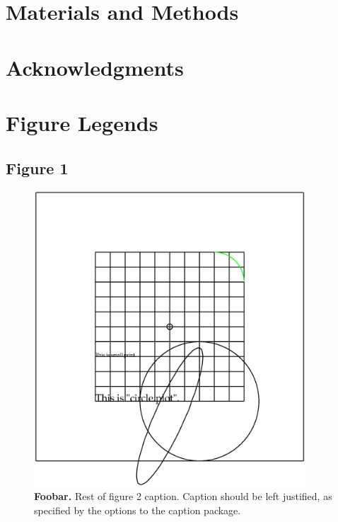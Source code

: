 \documentclass[10pt]{article}
\begin{document}
\section*{Materials and Methods}

\section*{Acknowledgments}



\section*{Figure Legends}

\subsection*{Figure 1}
\begin{figure}[!ht]
\begin{center}
\includegraphics[width=4in]{figure1/figure1.eps}
\end{center}
\caption{
{\bf Foobar.}  Rest of figure 2  caption.  Caption 
should be left justified, as specified by the options to the caption 
package.
}
\label{Figure_label}
\end{figure}
\end{document}
